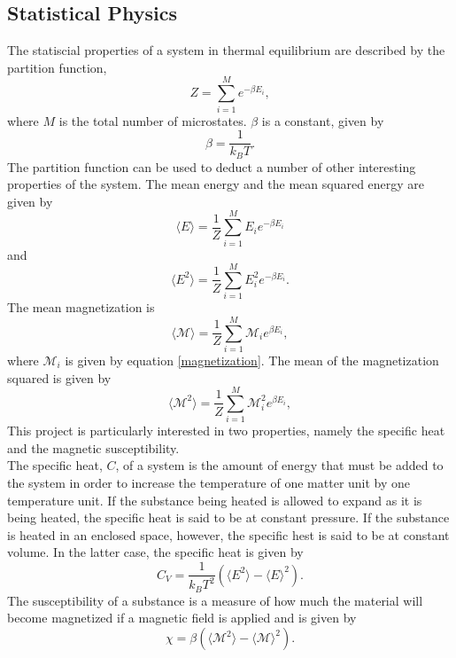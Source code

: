 \documentclass[notitlepage, reprint, nofootinbib]{revtex4-1}
\begin{document}
\subsection{Statistical Physics}
The statiscial properties of a system in thermal equilibrium are described by the partition function, 
\begin{equation}\label{partition_function}Z=\sum_{i=1}^M e^{-\beta E_i},\end{equation}
where $M$ is the total number of microstates. $\beta$ is a constant, given by 
\begin{equation}\label{beta}\beta=\frac{1}{k_BT}.\end{equation}
The partition function can be used to deduct a number of other interesting properties of the system. The mean energy and the mean squared energy are given by 
\begin{equation}\label{mean_energy}\langle E\rangle =\frac{1}{Z}\sum_{i=1}^ME_ie^{-\beta E_i}\end{equation}
and
\begin{equation}\label{mean_energy_2}\langle E^2\rangle = \frac{1}{Z}\sum_{i=1}^M E_i^2 e^{-\beta E_i}.\end{equation}
The mean magnetization is 
\begin{equation}\label{mean_mag}\langle \mathcal{M}\rangle =\frac{1}{Z}\sum_{i=1}^M\mathcal{M}_i e^{\beta E_i},\end{equation}
where $\mathcal{M}_i$ is given by equation \ref{magnetization}. The mean of the magnetization squared is given by 
\begin{equation}\label{mean_mag2}\langle \mathcal{M}^2\rangle =\frac{1}{Z}\sum_{i=1}^M\mathcal{M}_i^2 e^{\beta E_i},\end{equation}
This project is particularly interested in two properties, namely the specific heat and the magnetic susceptibility.\\[2mm]
The specific heat, $C$, of a system is the amount of energy that must be added to the system in order to increase the temperature of one matter unit by one temperature unit. If the substance being heated is allowed to expand as it is being heated, the specific heat is said to be at constant pressure. If the substance is heated in an enclosed space, however, the specific hest is said to be at constant volume. In the latter case, the specific heat is given by 
\begin{equation}\label{specific_heat}C_V = \frac{1}{k_BT^2}(\langle E^2\rangle - \langle E\rangle^2).\end{equation}
The susceptibility of a substance is a measure of how much the material will become magnetized if a magnetic field is applied and is given by 
\begin{equation}\label{susceptibility}\chi = \beta (\langle \mathcal{M}^2\rangle -\langle \mathcal{M}\rangle^2).\end{equation}
\end{document}
